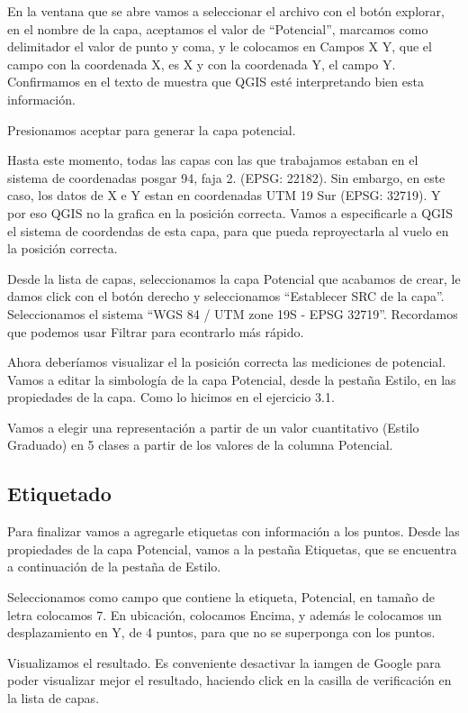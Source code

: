 \documentclass[]{article}
\begin{document}
En la ventana que se abre vamos a seleccionar el archivo con el botón explorar, en el nombre de la capa, aceptamos el valor de “Potencial”, marcamos como delimitador el valor de punto y coma, y le colocamos en Campos X Y, que el campo con la coordenada X, es X y con la coordenada Y, el campo Y. Confirmamos en el texto de muestra que QGIS esté interpretando bien esta información.



Presionamos aceptar para generar la capa potencial. 

Hasta este momento, todas las capas con las que trabajamos estaban en el sistema de coordenadas posgar 94, faja 2. (EPSG: 22182). Sin embargo, en este caso, los datos de X e Y estan en coordenadas UTM 19 Sur (EPSG: 32719). Y por eso QGIS no la grafica en la posición correcta. Vamos a especificarle a QGIS el sistema de coordendas de esta capa, para que pueda reproyectarla al vuelo en la posición correcta. 

Desde la lista de capas, seleccionamos la capa Potencial que acabamos de crear, le damos click con el botón derecho y seleccionamos “Establecer SRC de la capa”. Seleccionamos el sistema “WGS 84 / UTM zone 19S - EPSG 32719”. Recordamos que podemos usar Filtrar para econtrarlo más rápido.

Ahora deberíamos visualizar el la posición correcta las mediciones de potencial. Vamos a editar la simbología de la capa Potencial, desde la pestaña Estilo, en las propiedades de la capa. Como lo hicimos en el ejercicio 3.1.

Vamos a elegir una representación a partir de un valor cuantitativo (Estilo Graduado) en 5 clases a partir de los valores de la columna Potencial. 


\subsection{Etiquetado}

Para finalizar vamos a agregarle etiquetas con información a los puntos. Desde las propiedades de la capa Potencial, vamos a la pestaña Etiquetas, que se encuentra a continuación de la pestaña de Estilo. 

Seleccionamos como campo que contiene la etiqueta, Potencial, en tamaño de letra colocamos 7. En ubicación, colocamos Encima, y además le colocamos un desplazamiento en Y, de 4 puntos, para que no se superponga con los puntos.


Visualizamos el resultado. Es conveniente desactivar la iamgen de Google para poder visualizar mejor el resultado, haciendo click en la casilla de verificación en la lista de capas.
\end{document}
